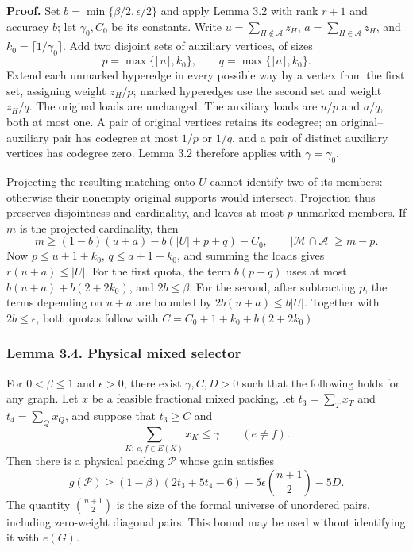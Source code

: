 \documentclass[english,11pt,a4paper]{article}
\newcounter{none}
\begin{document}
\textbf{Proof.} Set \(b=\min\{\beta/2,\epsilon/2\}\) and apply Lemma 3.2 with rank \(r+1\) and accuracy \(b\); let \(\gamma_0,C_0\) be its constants. Write \(u=\sum_{H\notin\mathcal A}z_H\), \(a=\sum_{H\in\mathcal A}z_H\), and \(k_0=\lceil1/\gamma_0\rceil\). Add two disjoint sets of auxiliary vertices, of sizes \[
p=\max\{\lceil u\rceil,k_0\},\qquad
q=\max\{\lceil a\rceil,k_0\}.
\] Extend each unmarked hyperedge in every possible way by a vertex from the first set, assigning weight \(z_H/p\); marked hyperedges use the second set and weight \(z_H/q\). The original loads are unchanged. The auxiliary loads are \(u/p\) and \(a/q\), both at most one. A pair of original vertices retains its codegree; an original--auxiliary pair has codegree at most \(1/p\) or \(1/q\), and a pair of distinct auxiliary vertices has codegree zero. Lemma 3.2 therefore applies with \(\gamma=\gamma_0\).

Projecting the resulting matching onto \(U\) cannot identify two of its members: otherwise their nonempty original supports would intersect. Projection thus preserves disjointness and cardinality, and leaves at most \(p\) unmarked members. If \(m\) is the projected cardinality, then \[
m\ge(1-b)(u+a)-b(|U|+p+q)-C_0,
\qquad |\mathcal M\cap\mathcal A|\ge m-p.
\] Now \(p\le u+1+k_0\), \(q\le a+1+k_0\), and summing the loads gives \(r(u+a)\le|U|\). For the first quota, the term \(b(p+q)\) uses at most \(b(u+a)+b(2+2k_0)\), and \(2b\le\beta\). For the second, after subtracting \(p\), the terms depending on \(u+a\) are bounded by \(2b(u+a)\le b|U|\). Together with \(2b\le\epsilon\), both quotas follow with \(C=C_0+1+k_0+b(2+2k_0)\).

\subsubsection{Lemma 3.4. Physical mixed selector}\label{lemma-3.4.-physical-mixed-selector}

For \(0<\beta\le1\) and \(\epsilon>0\), there exist \(\gamma,C,D>0\) such that the following holds for any graph. Let \(x\) be a feasible fractional mixed packing, let \(t_3=\sum_Tx_T\) and \(t_4=\sum_Qx_Q\), and suppose that \(t_3\ge C\) and \[
\sum_{K:\ e,f\in E(K)}x_K\le\gamma\qquad(e\ne f).
\tag{3.5}
\] Then there is a physical packing \(\mathcal P\) whose gain satisfies \[
g(\mathcal P)\ge(1-\beta)(2t_3+5t_4-6)
 -5\epsilon\binom{n+1}{2}-5D.
\tag{3.6}
\] The quantity \(\binom{n+1}{2}\) is the size of the formal universe of unordered pairs, including zero-weight diagonal pairs. This bound may be used without identifying it with \(e(G)\).
\end{document}
